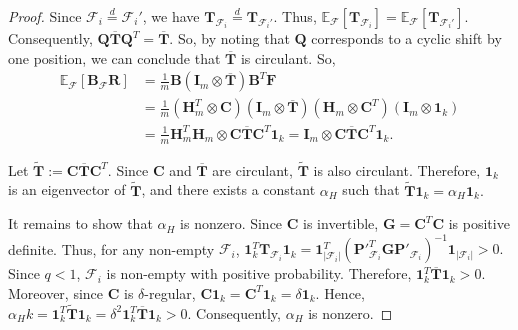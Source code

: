 \documentclass[journal,draftcls,onecolumn]{IEEEtran}
\theoremstyle{mystyle}
\newcommand{\bfC}{\mathbf{C}}
\newcommand{\bfF}{\mathbf{F}}
\newcommand{\bfH}{\mathbf{H}}
\newcommand{\bfT}{\mathbf{T}}
\newcommand{\bfB}{\mathbf{B}}
\newcommand{\bfI}{\mathbf{I}}
\newcommand{\cF}{\mathcal{F}}
\begin{document}
\begin{proof}
Since $\cF_i  \overset{d}{=} \cF_i'$, we have $\bfT_{\cF_i} \overset{d} {=} \bfT_{\cF_i'}$.   Thus, $\mathbb{E}_{\cF}\left[\bfT_{\cF_i}\right] = \mathbb{E}_{\cF}\left[\bfT_{\cF_i'}\right]$. Consequently, $
\mathbf{Q}\overline{\mathbf{T}}\mathbf{Q}^T
=
\overline{\mathbf{T}}.
$
So, by noting that $\mathbf{Q}$ corresponds to a cyclic shift by one position, we can conclude that $\overline{\mathbf{T}}$ is circulant. So,
\begin{align*}
\mathbb{E}_{\mathcal{F}}
[\mathbf{B}_{\mathcal{F}}\mathbf{R}]
&=
\frac{1}{m} \bfB (\mathbf{I}_m\otimes\overline{\mathbf{T}}) \mathbf{B}^T \bfF\\
&=
\frac{1}{m}(\mathbf{H}_m^T\otimes\mathbf{C})
\left(\mathbf{I}_m\otimes\overline{\mathbf{T}}
\right)
(\mathbf{H}_m\otimes\mathbf{C}^T)(\bfI_m \otimes \mathbf{1}_k)\\
&=\frac{1}{m} \bfH_m^T\bfH_m \otimes \bfC \overline{\mathbf{T}} \bfC^T\mathbf{1}_k = \bfI_m \otimes  \bfC \overline{\mathbf{T}} \bfC^T\mathbf{1}_k .
\end{align*}

Let
$
\tilde{\mathbf{T}}:=
\mathbf{C}\overline{\mathbf{T}}\mathbf{C}^T.$
Since $\mathbf{C}$ and $\overline{\mathbf{T}}$ are circulant,
$\tilde{\mathbf{T}}$ is also circulant. Therefore, $\mathbf{1}_k$ is an
eigenvector of $\tilde{\mathbf{T}}$, and there exists a constant $\alpha_H$
such that $\tilde{\mathbf{T}}\mathbf{1}_k=\alpha_H\mathbf{1}_k.$


It remains to show that $\alpha_H$ is nonzero. Since $\mathbf{C}$ is
invertible, $\mathbf{G}=\mathbf{C}^T\mathbf{C}$ is positive definite.
Thus, for any non-empty $\mathcal{F}_i$,
$
\mathbf{1}_k^T\mathbf{T}_{\mathcal{F}_i}\mathbf{1}_k
=
\mathbf{1}_{|\mathcal{F}_i|}^T
\left(
\mathbf{P}'^{T}_{\mathcal{F}_i}
\mathbf{G}
\mathbf{P}'_{\mathcal{F}_i}
\right)^{-1}
\mathbf{1}_{|\mathcal{F}_i|}
>0.
$
Since $q<1$, $\mathcal{F}_i$ is non-empty with positive probability.
Therefore,
$
\mathbf{1}_k^T\overline{\mathbf{T}}\mathbf{1}_k>0
.$ Moreover, since $\mathbf{C}$ is $\delta$-regular,
$\mathbf{C}\mathbf{1}_k=\mathbf{C}^T\mathbf{1}_k
=\delta\mathbf{1}_k$. Hence,
$
\alpha_H k
=
\mathbf{1}_k^T\widetilde{\mathbf{T}}\mathbf{1}_k
=
\delta^2
\mathbf{1}_k^T\overline{\mathbf{T}}\mathbf{1}_k
>0.
$ Consequently, $\alpha_H$ is nonzero.








\end{proof}
\end{document}
